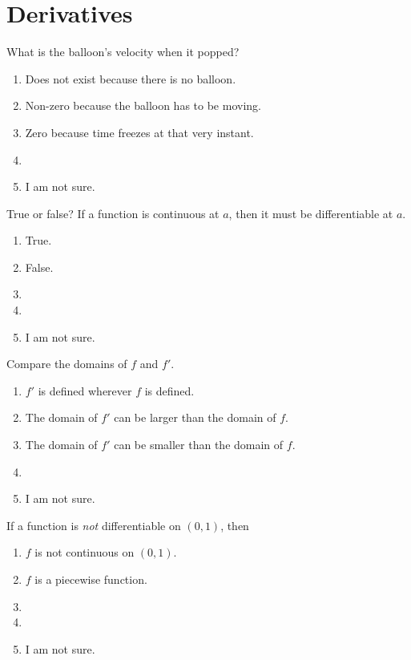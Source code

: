 \documentclass[14pt]{beamer}
\begin{document}
\section{Derivatives}
\begin{frame}
  What is the balloon's velocity when it popped?

  \medskip
  \begin{enumerate} 
    \item Does not exist because there is no balloon.
    \item Non-zero because the balloon has to be moving. 
    \item Zero because time freezes at that very instant. 
    \item 
    \item I am not sure.
  \end{enumerate} 
\end{frame}


\begin{frame}
  True or false? If a function is continuous at \(a\), then it must be differentiable at \(a\).

  \medskip
  \begin{enumerate} 
    \item True.
    \item False.
    \item 
    \item 
    \item I am not sure.
  \end{enumerate} 
\end{frame}


\begin{frame}
  Compare the domains of \(f\) and \(f'\).

  \medskip
  \begin{enumerate} 
    \item \(f'\) is defined wherever \(f\) is defined.
    \item The domain of \(f'\) can be larger than the domain of \(f\).
    \item The domain of \(f'\) can be smaller than the domain of \(f\).
    \item 
    \item I am not sure.
  \end{enumerate} 
\end{frame}


\begin{frame}
  If a function is \emph{not} differentiable on \((0,1)\), then 

  \medskip
  \begin{enumerate} 
    \item \(f\) is not continuous on \((0,1)\).
    \item \(f\) is a piecewise function.
    \item 
    \item 
    \item I am not sure.
  \end{enumerate} 
\end{frame}
\end{document}
